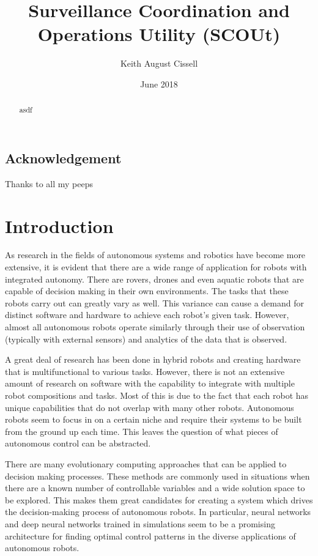 \documentclass[]{report}
\begin{document}
\title{Surveillance Coordination and Operations Utility (SCOUt)}
\author{Keith August Cissell}
\date{June 2018}

\maketitle

\begin{abstract}
  asdf
\end{abstract}

\section*{Acknowledgement}
Thanks to all my peeps

\tableofcontents
\newpage



\chapter{Introduction}
As research in the fields of autonomous systems and robotics have become more extensive, it is evident that there are a wide range of application for robots with integrated autonomy.  There are rovers, drones and even aquatic robots that are capable of decision making in their own environments. The tasks that these robots carry out can greatly vary as well. This variance can cause a demand for distinct software and hardware to achieve each robot’s given task. However, almost all autonomous robots operate similarly through their use of observation (typically with external sensors) and analytics of the data that is observed.

A great deal of research has been done in hybrid robots and creating hardware that is multifunctional to various tasks. However, there is not an extensive amount of research on software with the capability to integrate with multiple robot compositions and tasks. Most of this is due to the fact that each robot has unique capabilities that do not overlap with many other robots. Autonomous robots seem to focus in on a certain niche and require their systems to be built from the ground up each time. This leaves the question of what pieces of autonomous control can be abstracted.

There are many evolutionary computing approaches that can be applied to decision making processes. These methods are commonly used in situations when there are a known number of controllable variables and a wide solution space to be explored. This makes them great candidates for creating a system which drives the decision-making process of autonomous robots. In particular, neural networks and deep neural networks trained in simulations seem to be a promising architecture for finding optimal control patterns in the diverse applications of autonomous robots.
\end{document}
